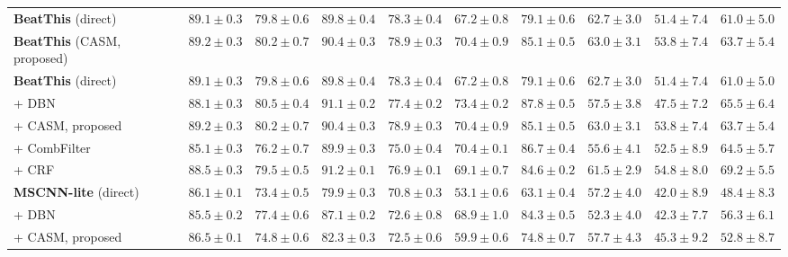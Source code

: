 \documentclass{article}
\begin{document}
\begin{table}[t]
\begin{tabular}{l|ccc|ccc|ccc}
\textbf{BeatThis} (direct) \cite{foscarin2024beat}
& $89.1 \pm 0.3$ & $79.8 \pm 0.6$ & $89.8 \pm 0.4$
& $78.3 \pm 0.4$ & $67.2 \pm 0.8$ & $79.1 \pm 0.6$
& $62.7 \pm 3.0$ & $51.4 \pm 7.4$ & $61.0 \pm 5.0$ \\

\textbf{BeatThis} (CASM, proposed)
& $89.2 \pm 0.3$ & $80.2 \pm 0.7$ & $90.4 \pm 0.3$
& $78.9 \pm 0.3$ & $70.4 \pm 0.9$ & $85.1 \pm 0.5$
& $63.0 \pm 3.1$ & $53.8 \pm 7.4$ & $63.7 \pm 5.4$ \\

\midrule

\textbf{BeatThis} (direct) \cite{foscarin2024beat}
& $89.1 \pm 0.3$ & $79.8 \pm 0.6$ & $89.8 \pm 0.4$
& $78.3 \pm 0.4$ & $67.2 \pm 0.8$ & $79.1 \pm 0.6$
& $62.7 \pm 3.0$ & $51.4 \pm 7.4$ & $61.0 \pm 5.0$ \\

\quad + DBN
& $88.1 \pm 0.3$ & $80.5 \pm 0.4$ & $91.1 \pm 0.2$
& $77.4 \pm 0.2$ & $73.4 \pm 0.2$ & $87.8 \pm 0.5$
& $57.5 \pm 3.8$ & $47.5 \pm 7.2$ & $65.5 \pm 6.4$ \\

\quad + CASM, proposed
& $89.2 \pm 0.3$ & $80.2 \pm 0.7$ & $90.4 \pm 0.3$
& $78.9 \pm 0.3$ & $70.4 \pm 0.9$ & $85.1 \pm 0.5$
& $63.0 \pm 3.1$ & $53.8 \pm 7.4$ & $63.7 \pm 5.4$ \\

\quad + CombFilter
& $85.1 \pm 0.3$ & $76.2 \pm 0.7$ & $89.9 \pm 0.3$
& $75.0 \pm 0.4$ & $70.4 \pm 0.1$ & $86.7 \pm 0.4$
& $55.6 \pm 4.1$ & $52.5 \pm 8.9$ & $64.5 \pm 5.7$ \\

\quad + CRF
& $88.5 \pm 0.3$ & $79.5 \pm 0.5$ & $91.2 \pm 0.1$
& $76.9 \pm 0.1$ & $69.1 \pm 0.7$ & $84.6 \pm 0.2$
& $61.5 \pm 2.9$ & $54.8 \pm 8.0$ & $69.2 \pm 5.5$ \\

\midrule

\textbf{MSCNN-lite} (direct)
& $86.1 \pm 0.1$ & $73.4 \pm 0.5$ & $79.9 \pm 0.3$
& $70.8 \pm 0.3$ & $53.1 \pm 0.6$ & $63.1 \pm 0.4$
& $57.2 \pm 4.0$ & $42.0 \pm 8.9$ & $48.4 \pm 8.3$ \\

\quad + DBN
& $85.5 \pm 0.2$ & $77.4 \pm 0.6$ & $87.1 \pm 0.2$
& $72.6 \pm 0.8$ & $68.9 \pm 1.0$ & $84.3 \pm 0.5$
& $52.3 \pm 4.0$ & $42.3 \pm 7.7$ & $56.3 \pm 6.1$ \\

\quad + CASM, proposed
& $86.5 \pm 0.1$ & $74.8 \pm 0.6$ & $82.3 \pm 0.3$
& $72.5 \pm 0.6$ & $59.9 \pm 0.6$ & $74.8 \pm 0.7$
& $57.7 \pm 4.3$ & $45.3 \pm 9.2$ & $52.8 \pm 8.7$ \\


\end{tabular}
\end{table}
\end{document}
